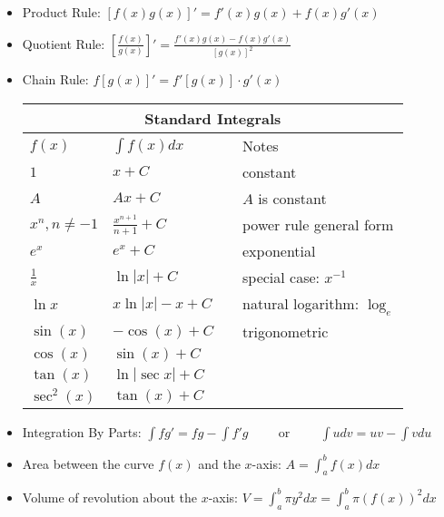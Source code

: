 \begin{itemize}
	\item Product Rule: $[f(x)g(x)]' = f'(x)g(x) + f(x)g'(x)$
	\item Quotient Rule: $\displaystyle \left[\frac{f(x)}{g(x)}\right]' = \frac{f'(x)g(x) - f(x)g'(x)}{[g(x)]^2}$
	\item Chain Rule: $f[g(x)]' = f'[g(x)] \cdot g'(x)$
\clearpage
\thispagestyle{empty}
	\begin{center}
		\renewcommand{\arraystretch}{1.2}
		\begin{tabular}{llcl}
			\multicolumn{4}{c}{Standard Integrals}\\\midrule
			$f(x)$  &  $\int f(x)dx$&&Notes \\ \midrule
			$1$&$x+C$&&constant\\
			$A$&$Ax+C$&&$A$ is constant\\\midrule
			$x^n, n \neq -1$ & $\displaystyle\frac{x^{n+1}}{n+1}+C$&&power rule general form\\ 
			$e^x$ & $e^x+C$&&exponential\\ 
			$\frac{1}{x}$ & $\ln|x|+C$&&special case: $x^{-1}$\\
			$\ln x$&$x\ln |x|-x+C$&&natural logarithm: $\log_e$\\\midrule
			$\sin(x)$ & $-\cos(x)+C$&& trigonometric \\ 
			$\cos(x)$ & $\sin(x)+C$\\ 
			$\tan (x)$&$\ln |\sec x|+C$\\
			$\sec^2(x)$ & $\tan(x)+C$ \\ \bottomrule
		\end{tabular}
	\end{center}
	\item Integration By Parts: $\displaystyle \int fg' = fg-\int f'g \hspace{1cm} \text{or} \hspace{1cm} \int udv = uv - \int vdu$
	\item Area between the curve $f(x)$ and the $x$-axis: $\displaystyle A=\int_{a}^{b} f(x)dx$\\
	\item Volume of revolution about the $x$-axis:
	$\displaystyle V= \int_{a}^{b} \pi y^2 dx = \int_{a}^{b} \pi (f(x))^2 dx$
\end{itemize}
